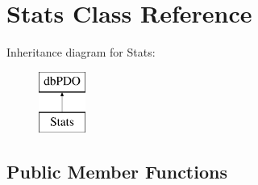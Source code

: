 \hypertarget{class_stats}{\section{Stats Class Reference}
\label{class_stats}
}
Inheritance diagram for Stats\-:\begin{figure}[H]
\begin{center}
\leavevmode
\includegraphics[height=2.000000cm]{class_stats}
\end{center}
\end{figure}
\subsection*{Public Member Functions}
